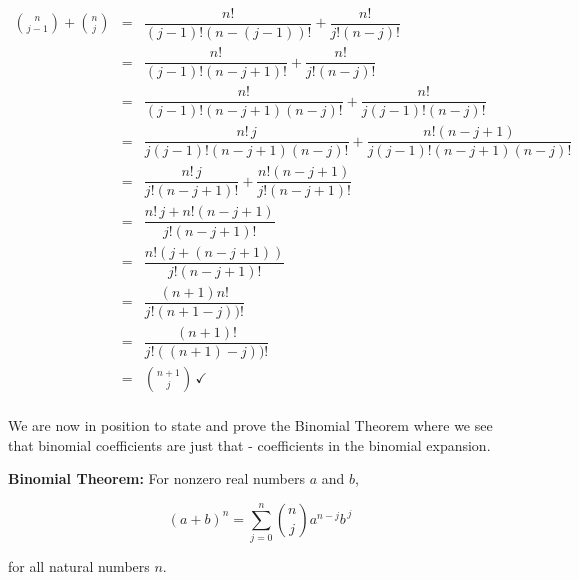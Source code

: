 \[ \begin{array}{rcl}

\displaystyle{\binom{n}{j-1} + \binom{n}{j}} & = & \dfrac{n!}{(j-1)! (n-(j-1))!} + \dfrac{n!}{j! (n-j)!}  \\ [15pt]

& = & \dfrac{n!}{(j-1)! (n-j+1)!} + \dfrac{n!}{j! (n-j)!}  \\ [15pt]

& = & \dfrac{n!}{(j-1)! (n-j+1)(n-j)!} + \dfrac{n!}{j(j-1)! (n-j)!}  \\ [15pt]

& = & \dfrac{n! \, j}{j(j-1)! (n-j+1)(n-j)!} + \dfrac{n! (n-j+1)}{j(j-1)! (n-j+1)(n-j)!} \\ [15pt]

& = & \dfrac{n! \, j}{j! (n-j+1)!} + \dfrac{n! (n-j+1)}{j! (n-j+1)!} \\ [15pt]

& = & \dfrac{n! \, j + n! (n-j+1)}{j! (n-j+1)!} \\ [15pt]

& = & \dfrac{n!\left( j + (n-j+1)\right)}{j! (n-j+1)!} \\ [15pt]

& = & \dfrac{(n+1) n!}{j! (n+1-j))!} \\ [15pt] 

& = & \dfrac{(n+1)!} {j! ((n+1)-j))!} \\ [15pt]

& = & \displaystyle{\binom{n+1}{j}} \, \checkmark \\ 

\end{array} \]

We are now in position to state and prove the Binomial Theorem where we see that binomial coefficients are just that - coefficients in the binomial expansion.

\smallskip

\colorbox{ResultColor}{\bbm

\begin{thm}  \label{BinomialTheorem}  \textbf{Binomial Theorem:}  For nonzero real numbers $a$ and $b$,

\[(a+b)^{n} =\displaystyle{\sum_{j=0}^{n} \binom{n}{j} a^{n-j} b^{\, j}} \]

for all natural numbers $n$.

\end{thm}

\ebm}

\smallskip

